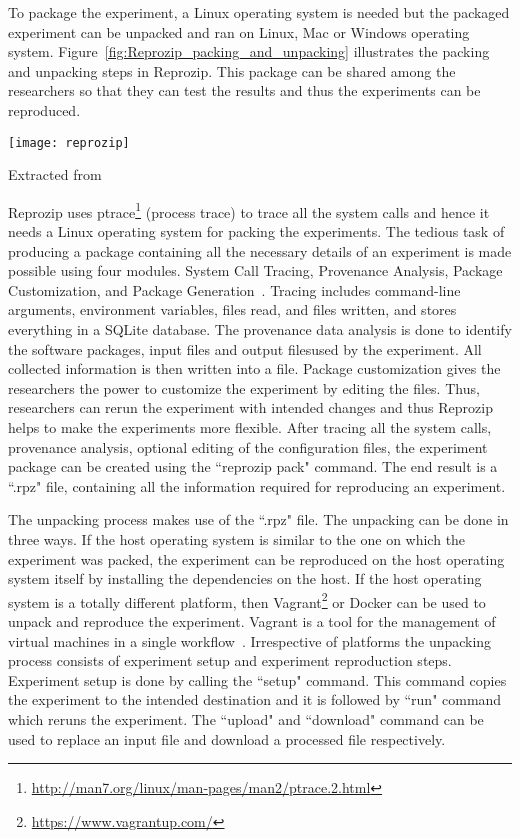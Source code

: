 To package the experiment, a Linux operating system is needed but the packaged experiment can be unpacked and ran on Linux, Mac or Windows operating system. Figure~\ref{fig:Reprozip_packing_and_unpacking} illustrates the packing and unpacking steps in Reprozip. This package can be shared among the researchers so that they can test the results and thus the experiments can be reproduced.

\begin{center}
\texttt{[image: reprozip]}
\label{fig:Reprozip_packing_and_unpacking}
\caption*{Extracted from \cite{Rampin2016}}
\end{center}

Reprozip uses ptrace\footnote{\url{http://man7.org/linux/man-pages/man2/ptrace.2.html}} (process trace) to trace all the system calls and hence it needs a Linux operating system for packing the experiments. The tedious task of producing a package containing all the necessary details of an experiment is made possible using four modules. System Call Tracing, Provenance Analysis, Package Customization, and Package Generation~\cite{Chirigati:2013:RUP:2482613.2482614}. Tracing includes command-line arguments, environment variables, files read, and files written, and stores everything in a SQLite database. The provenance data analysis is done to identify the software packages, input files and output filesused by the experiment. All collected information is then written into a file. Package customization gives the researchers the power to customize the experiment by editing the files. Thus, researchers can rerun the experiment with intended changes and thus Reprozip helps to make the experiments more flexible. After tracing all the system calls, provenance analysis, optional editing of the configuration files, the experiment package can be created using the ``reprozip pack" command. The end result is a ``.rpz" file, containing all the information required for reproducing an experiment.

The unpacking process makes use of the ``.rpz" file. The unpacking can be done in three ways. If the host operating system is similar to the one on which the experiment was packed, the experiment can be reproduced on the host operating system itself by installing the dependencies on the host. If the host operating system is a totally different platform, then Vagrant\footnote{\url{https://www.vagrantup.com/}} or Docker can be used to unpack and reproduce the experiment. Vagrant is a tool for the management of virtual machines in a single workflow~\cite{vagrant}. Irrespective of platforms the unpacking process consists of experiment setup and experiment reproduction steps. Experiment setup is done by calling the ``setup" command. This command copies the experiment to the intended destination and it is followed by ``run" command which reruns the experiment. The ``upload" and ``download" command can be used to replace an input file and download a processed file respectively.

